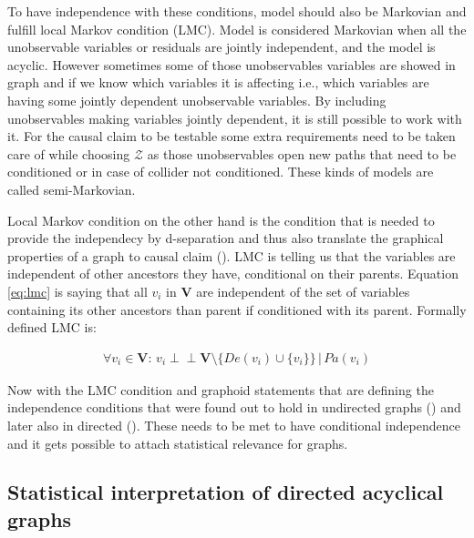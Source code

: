 \documentclass[main=english,12pt,a4paper,pdftex,econ,utf8]{aaltothesis}
\newcommand{\indep}{\perp \!\!\! \perp}
\newcommand{\pa}[1]{Pa(#1)}
\newcommand{\de}[1]{De(#1)}
\newcommand{\z}{\mathcal{Z}}
\newcommand{\vars}{\bm{V}}
\begin{document}


To have independence with these conditions, model should also be Markovian and fulfill local Markov condition (LMC). Model is considered Markovian when all the unobservable variables or residuals are jointly independent, and the model is acyclic. However sometimes some of those unobservables variables are showed in graph and if we know which variables it is affecting i.e., which variables are having some jointly dependent unobservable variables. By including unobservables making variables jointly dependent, it is still possible to work with it. For the causal claim to be testable some extra requirements need to be taken care of while choosing $\z$ as those unobservables open new paths that need to be conditioned or in case of collider not conditioned. These kinds of models are called semi-Markovian.

Local Markov condition on the other hand is the condition that is needed to provide the independecy by d-separation and thus also translate the graphical properties of a graph to causal claim (\cite{Heckman2015}). LMC is telling us that the variables are independent of other ancestors they have, conditional on their parents. Equation \ref{eq:lmc} is saying that all $v_i$ in $\vars$ are independent of the set of variables containing its other ancestors than parent if conditioned with its parent. Formally defined LMC is:

\begin{gather} \label{eq:lmc}
    \forall v_{i}\in\vars\text{: }v_{i}\indep\vars\setminus\{\de{v_{i}}\cup \{v_{i}\}\}\,|\,\pa{v_{i}}
\end{gather}

Now with the LMC condition and graphoid statements that are defining the independence conditions that were found out to hold in undirected graphs (\cite{Paz1985}) and later also in directed (\cite{Pearl1986}). These needs to be met to have conditional independence and it gets possible to attach statistical relevance for graphs.

\subsection{Statistical interpretation of directed acyclical graphs}
\end{document}
